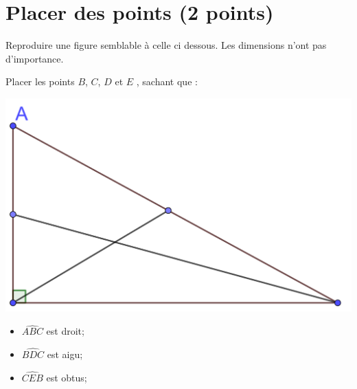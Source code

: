 \section{Placer des points (2 points)}

\begin{questions}
	\question[1] Reproduire une figure semblable à celle ci dessous. Les dimensions n'ont pas d'importance.
	
	

	\question[2] Placer les points $B$, $C$, $D$ et $E$ %
	, sachant que :
	
	\begin{multicols}{2}
		
		\begin{center}
			\includegraphics[scale=0.15]{img/ex1}
		\end{center}
		
		\begin{itemize}
			\item $\widehat{ABC}$ est droit;
			\item $\widehat{BDC}$ est aigu;
			\item $\widehat{CEB}$ est obtus;
		\end{itemize}
	\end{multicols}
	
	
\end{questions}

